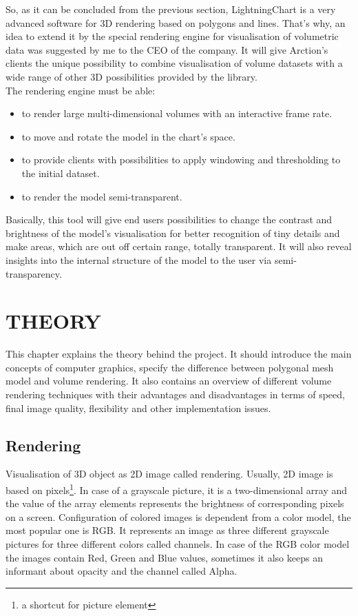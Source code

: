 \documentclass[twoside, english, 11pt]{report}
\begin{document}
So, as it can be concluded from the previous section, LightningChart is a very advanced software for 3D rendering based on polygons and lines. That's why, an idea to extend it by the special rendering engine for visualisation of volumetric data was suggested by me to the CEO of the company. It will give Arction's clients the unique possibility to combine visualisation of volume datasets with a wide range of other 3D possibilities provided by the library. \\

The rendering engine must be able:
\begin{itemize} 
\item to render large multi-dimensional volumes with an interactive frame rate.
\item to move and rotate the model in the chart's space.
\item to provide clients with possibilities to apply windowing and thresholding to the initial dataset.
\item to render the model semi-transparent.
\end{itemize}

Basically, this tool will give end users possibilities to change the contrast and brightness of the model's visualisation for better recognition of tiny details and make areas, which are out off certain range, totally transparent. It will also reveal insights into the internal structure of the model to the user via semi-transparency.

\chapter{THEORY}

This chapter explains the theory behind the project. It should introduce the main concepts of computer graphics, specify the difference between polygonal mesh model and volume rendering. It also contains an overview of different volume rendering techniques with their advantages and disadvantages in terms of speed, final image quality, flexibility and other implementation issues.

\section{Rendering}

Visualisation of 3D object as 2D image called rendering. Usually, 2D image is based on pixels\footnote{a shortcut for picture element}. In case of a grayscale picture, it is a two-dimensional array and the value of the array elements represents the brightness of corresponding pixels on a screen. Configuration of colored images is dependent from a color model, the most popular one is RGB. It represents an image as three different grayscale pictures for three different colors called channels. In case of the RGB color model the images contain Red, Green and Blue values, sometimes it also keeps an informant about opacity and the channel called Alpha.\\
\end{document}
